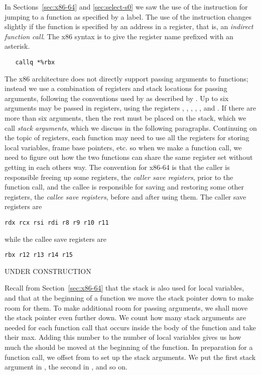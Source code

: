 \documentclass[11pt]{book}
\begin{document}
In Sections~\ref{sec:x86-64} and \ref{sec:select-s0} we saw the use of
the  instruction for jumping to a function as specified by
a label. The use of the instruction changes slightly if the function
is specified by an address in a register, that is, an \emph{indirect
  function call}. The x86 syntax is to give the register name prefixed
with an asterisk.
\begin{lstlisting}
   callq *%rbx
\end{lstlisting}

The x86 architecture does not directly support passing arguments to
functions; instead we use a combination of registers and stack
locations for passing arguments, following the conventions used by
 as described by \cite{Matz:2013aa}. Up to six arguments may
be passed in registers, using the registers , ,
, , , and . If there are more
than six arguments, then the rest must be placed on the stack, which
we call \emph{stack arguments}, which we discuss in the following
paragraphs. Continuing on the topic of registers, each function may
need to use all the registers for storing local variables, frame base
pointers, etc. so when we make a function call, we need to figure out
how the two functions can share the same register set without getting
in each others way. The convention for x86-64 is that the caller is
responsible freeing up some registers, the \emph{caller save
  registers}, prior to the function call, and the callee is
responsible for saving and restoring some other registers, the
\emph{callee save registers}, before and after using them. The
caller save registers are 
\begin{lstlisting}
rdx rcx rsi rdi r8 r9 r10 r11
\end{lstlisting}
while the callee save registers are 
\begin{lstlisting}
rbx r12 r13 r14 r15
\end{lstlisting}
UNDER CONSTRUCTION

Recall from Section~\ref{sec:x86-64} that the stack is also used for
local variables, and that at the beginning of a function we move the
stack pointer  down to make room for them.  To make
additional room for passing arguments, we shall move the stack pointer
even further down. We count how many stack arguments are needed for
each function call that occurs inside the body of the function and
take their max. Adding this number to the number of local variables
gives us how much the  should be moved at the beginning of
the function. In preparation for a function call, we offset from
 to set up the stack arguments. We put the first stack
argument in , the second in , and so on.
\end{document}
